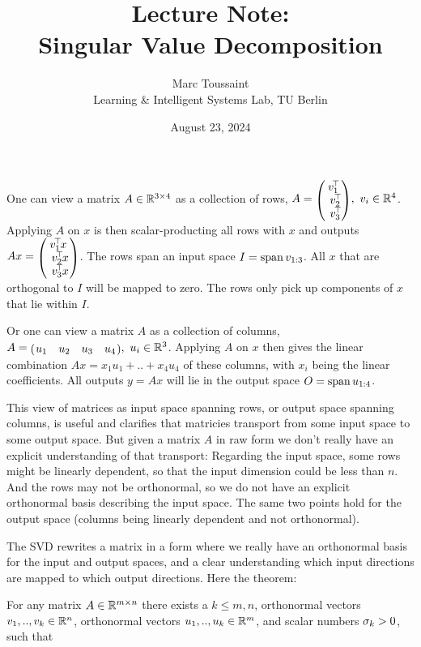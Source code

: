 
\note

\title{Lecture Note:\\ Singular Value Decomposition}
\author{Marc Toussaint\\\small Learning \& Intelligent Systems Lab, TU Berlin}
\date{August 23, 2024}

\makeatletter
\renewcommand{\@seccntformat}[1]{}
\makeatother

\notetitle


One can view a matrix $A\in{\mathbb{R}}^{3\times 4}$ as a collection of rows,
$A=\mat{c}{v_1^\T \\\ v_2^\T \\\ v_3^\T},~ v_i\in\RRR^4$. Applying $A$ on $x$ is then
scalar-producting all rows with $x$ and outputs $Ax=\mat{c}{v_1^\T
x \\\ v_2^\T x \\\ v_3^\T x}$. The rows span an input space $I=\operatorname{span}
v_{1:3}$. All $x$ that are orthogonal to $I$ will be mapped to
zero. The rows only pick up components of $x$ that lie within $I$.

Or one can view a matrix $A$ as a collection of columns,
$A=\mat{cccc}{u_1 & u_2 & u_3 & u_4},~ u_i\in\RRR^3$. Applying $A$ on $x$ then gives
the linear combination $Ax = x_1 u_1 + .. + x_4 u_4$ of these columns,
with $x_i$ being the linear coefficients. All outputs $y = A x$ will
lie in the output space $O=\operatorname{span} u_{1:4}$.

This view of matrices as input space spanning rows, or output space
spanning columns, is useful and clarifies that matricies transport
from some input space to some output space. But given a matrix $A$ in raw
form we
don't really have an explicit understanding of that transport:
Regarding the input space, some
rows might be linearly dependent, so that the input dimension could be
less than $n$. And the rows may not be orthonormal, so we do not have
an explicit orthonormal basis describing the input space. The same two points
hold for the output space (columns being linearly dependent and not
orthonormal).

The SVD rewrites a matrix in a form where we really have an orthonormal basis
for the input and output spaces, and a clear understanding which input
directions are mapped to which output directions. Here the theorem:

For any matrix $A\in{\mathbb{R}}^{m\times n}$ there exists a $k\le m,n$, 
orthonormal vectors $v_1,..,v_k \in {\mathbb{R}}^n$, orthonormal vectors
$u_1,..,u_k\in{\mathbb{R}}^m$, and scalar numbers $\sigma_k>0$, such that

